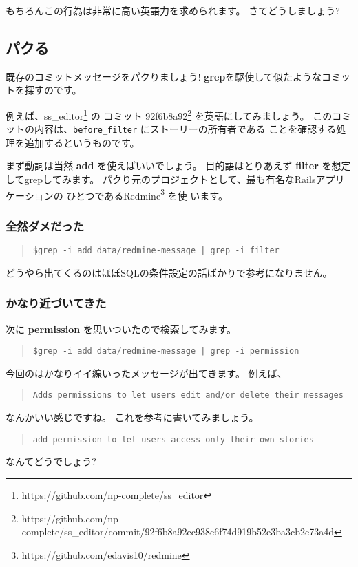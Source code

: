 \documentclass{jarticle}
\begin{document}
 もちろんこの行為は非常に高い英語力を求められます。
 さてどうしましょう?

  \subsection{パクる}
  既存のコミットメッセージをパクりましょう!
  {\bf grep}を駆使して似たようなコミットを探すのです。

  例えば、ss\_editor\footnote{https://github.com/np-complete/ss\_editor} の
  コミット 92f6b8a92\footnote{https://github.com/np-complete/ss\_editor/commit/92f6b8a92ec938e6f74d919b52e3ba3cb2e73a4d}
  を英語にしてみましょう。
  このコミットの内容は、{\tt before\_filter} にストーリーの所有者である
  ことを確認する処理を追加するというものです。

  まず動詞は当然 {\bf add} を使えばいいでしょう。
  目的語はとりあえず {\bf filter} を想定してgrepしてみます。
  パクり元のプロジェクトとして、最も有名なRailsアプリケーションの
  ひとつであるRedmine\footnote{https://github.com/edavis10/redmine} を使
  います。

  \subsubsection{全然ダメだった}
  \begin{quote}
   {\tt \$grep -i add data/redmine-message | grep -i filter }
  \end{quote}
  どうやら出てくるのはほぼSQLの条件設定の話ばかりで参考になりません。

  \subsubsection{かなり近づいてきた}
  次に {\bf permission} を思いついたので検索してみます。
  \begin{quote}
   {\tt \$grep -i add data/redmine-message | grep -i permission }
  \end{quote}

  今回のはかなりイイ線いったメッセージが出てきます。
  例えば、
  \begin{quote}
   {\tt Adds permissions to let users edit and/or delete their messages }
  \end{quote}
  なんかいい感じですね。
  これを参考に書いてみましょう。
  \begin{quote}
   {\tt add permission to let users access only their own stories }
  \end{quote}
  なんてどうでしょう?
\end{document}
